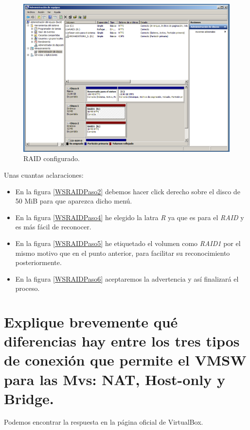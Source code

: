 \documentclass[a4paper,titlepage,12pt]{scrartcl}	%
\numberwithin{figure}{section} %
\numberwithin{table}{section} %
\begin{document}
	\begin{figure}[H]
		\centering
		\includegraphics[scale=0.35]{./Imagenes/WSRAIDPaso7.png}
		\caption[RAID configurado.]{RAID configurado.}
		\label{WSRAIDPaso7}
	\end{figure}
	
	Unas cuantas aclaraciones:
	\begin{itemize}
		\item En la figura \ref{WSRAIDPaso2} debemos hacer click derecho sobre el disco de 50 MiB para que aparezca dicho menú.
		\item En la figura \ref{WSRAIDPaso4} he elegido la latra \textit{R} ya que es para el \textit{RAID} y es más fácil de reconocer.
		\item En la figura \ref{WSRAIDPaso5} he etiquetado el volumen como \textit{RAID1} por el mismo motivo que en el punto anterior, para facilitar su reconocimiento posteriormente.
		\item En la figura \ref{WSRAIDPaso6} aceptaremos la advertencia y así finalizará el proceso.
	\end{itemize}
		
	\section[Explique brevemente qué diferencias hay entre los tres tipos de conexión que permite el VMSW para las Mvs: NAT, Host-only y Bridge.]{Explique brevemente qué diferencias hay entre los tres tipos de conexión que permite el VMSW para las Mvs: NAT, Host-only y Bridge.}
	
	Podemos encontrar la respuesta en la página oficial de VirtualBox. \cite{conexionesVMSW}
	
\end{document}
